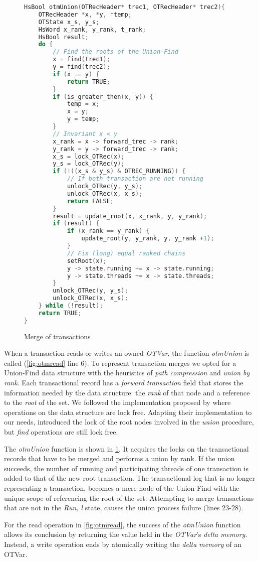 \begin{figure}
\begin{lstlisting}[language=C]
HsBool otmUnion(OTRecHeader* trec1, OTRecHeader* trec2){
    OTRecHeader *x, *y, *temp;
    OTState x_s, y_s;
    HsWord x_rank, y_rank, t_rank;
    HsBool result;
    do {
        // Find the roots of the Union-Find
        x = find(trec1);
        y = find(trec2);
        if (x == y) {
            return TRUE;
        }
        if (is_greater_then(x, y)) {
            temp = x;
            x = y;
            y = temp;
        }
        // Invariant x < y
        x_rank = x -> forward_trec -> rank;
        y_rank = y -> forward_trec -> rank;
        x_s = lock_OTRec(x);
        y_s = lock_OTRec(y);
        if (!((x_s & y_s) & OTREC_RUNNING)) {
            // If both transaction are not running
            unlock_OTRec(y, y_s);
            unlock_OTRec(x, x_s);
            return FALSE;
        }
        result = update_root(x, x_rank, y, y_rank);
        if (result) {
            if (x_rank == y_rank) {
                update_root(y, y_rank, y, y_rank +1);
            }
            // Fix (long) equal ranked chains
            setRoot(x);
            y -> state.running += x -> state.running;
            y -> state.threads += x -> state.threads;
        }
        unlock_OTRec(y, y_s);
        unlock_OTRec(x, x_s);
    } while (!result);
    return TRUE;
}
\end{lstlisting}
\caption{Merge of transactions}
\label{fig:otmunion}
\end{figure}

When a transaction reads or writes an owned \emph{OTVar}, the function \emph{otmUnion} is called (\cref{fig:otmread} line 6).
To represent transaction merges we opted for a Union-Find data structure with the heuristics of \emph{path compression} and \emph{union by rank}.
Each transactional record has a \emph{forward transaction} field that stores the information needed by the data structure: the \emph{rank} of that node and a reference to the \emph{root} of the set.
We followed the implementation proposed by \citet{Anderson94wait-freeparallel} where operations on the data structure are lock free.
Adapting their implementation to our needs, introduced the lock of the root nodes involved in the \emph{union} procedure, but \emph{find} operations are still lock free.

The \emph{otmUnion} function is shown in \cref{fig:otmunion}. It acquires the locks on the transactional records that have to be merged and performs a union by rank. If the union succeeds, the number of running and participating threads of one transaction is added to that of the new root transaction. The transactional log that is no longer representing a transaction, becomes a mere node of the Union-Find with the unique scope of referencing the root of the set. Attempting to merge transactions that are not in the \emph{Ru\textlangle n, l\textrangle} state, causes the union process failure (lines 23-28).

For the read operation in \cref{fig:otmread}, the success of the \emph{otmUnion} function allows its conclusion by returning the value held in the \emph{OTVar}'s \emph{delta memory}. Instead, a write operation ends by atomically writing the \emph{delta memory} of an OTVar.
